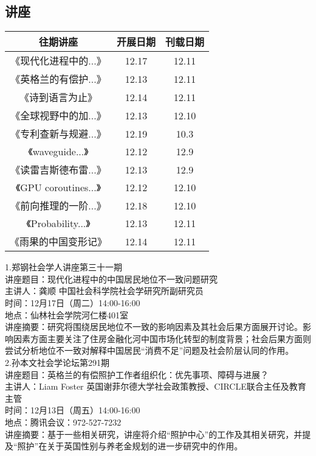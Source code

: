 \documentclass[letterpaper, 12pt]{article}
\begin{document}
\begin{multicols}{2}

\section{讲座}
\begin{tabular}{|c|c|c|}
    \hline
    往期讲座 & 开展日期 & 刊载日期\\
    \hline\hline
    《现代化进程中的...》 & 12.17 & 12.11\\
    《英格兰的有偿护...》 & 12.13 & 12.11\\
    《诗到语言为止》& 12.14 & 12.11\\
    《全球视野中的加...》& 12.13 & 12.10\\
    《专利查新与规避...》 & 12.19 & 10.3\\
    《waveguide...》 & 12.12 & 12.9\\
    《读雷吉斯德布雷...》 & 12.13 & 12.9\\
    《GPU coroutines...》 & 12.12 & 12.10\\
    《前向推理的一阶...》 & 12.18 & 12.10\\
    《Probability...》 & 12.13 & 12.11\\
    《雨果的中国变形记》 & 12.14 & 12.11\\
    \hline
\end{tabular}

1.郑钢社会学人讲座第三十一期\\
讲座题目：现代化进程中的中国居民地位不一致问题研究\\
主讲人：龚顺 中国社会科学院社会学研究所副研究员\\
时间：12月17日（周二）14:00-16:00\\
地点：仙林社会学院河仁楼401室\\
讲座摘要：研究将围绕居民地位不一致的影响因素及其社会后果方面展开讨论。影响因素方面主要关注了住房金融化河中国市场化转型的制度背景；社会后果方面则尝试分析地位不一致对解释中国居民“消费不足”问题及社会阶层认同的作用。\\
2.孙本文社会学论坛第291期\\
讲座题目：英格兰的有偿照护工作者组织化：优先事项、障碍与进展？\\
主讲人：Liam Foster 英国谢菲尔德大学社会政策教授、CIRCLE联合主任及教育主管\\
时间：12月13日（周五）14:00-16:00\\
地点：腾讯会议：972-527-7232\\
讲座摘要：基于一些相关研究，讲座将介绍“照护中心”的工作及其相关研究，并提及“照护”在关于英国性别与养老金规划的进一步研究中的作用。\\



\end{multicols}
\end{document}
